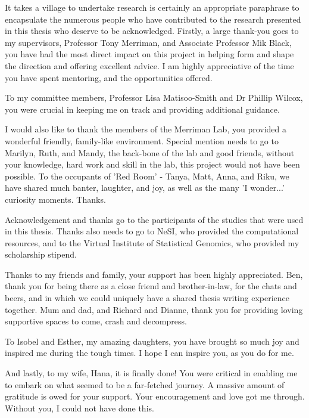 
It takes a village to undertake research is certainly an appropriate paraphrase to encapsulate the numerous people who have contributed to the research presented in this thesis who deserve to be acknowledged. Firstly, a large thank-you goes to my supervisors, Professor Tony Merriman, and Associate Professor Mik Black, you have had the most direct impact on this project in helping form and shape the direction and offering excellent advice. I am highly appreciative of the time you have spent mentoring, and the opportunities offered.

To my committee members, Professor Lisa Matisoo-Smith and Dr Phillip Wilcox, you were crucial in keeping me on track and providing additional guidance.

I would also like to thank the members of the Merriman Lab, you provided a wonderful friendly, family-like environment. Special mention needs to go to Marilyn, Ruth, and Mandy, the back-bone of the lab and good friends, without your knowledge, hard work and skill in the lab, this project would not have been possible. To the occupants of 'Red Room' - Tanya, Matt, Anna, and Riku, we have shared much banter, laughter, and joy, as well as the many 'I wonder...' curiosity moments. Thanks.

Acknowledgement and thanks go to the participants of the studies that were used in this thesis. Thanks also needs to go to NeSI, who provided the computational resources, and to the Virtual Institute of Statistical Genomics, who provided my scholarship stipend.

Thanks to my friends and family, your support has been highly appreciated. Ben, thank you for being there as a close friend and brother-in-law, for the chats and beers, and in which we could uniquely have a shared thesis writing experience together. Mum and dad, and Richard and Dianne, thank you for providing loving supportive spaces to come, crash and decompress.

To Isobel and Esther, my amazing daughters, you have brought so much joy and inspired me during the tough times. I hope I can inspire you, as you do for me.

And lastly, to my wife, Hana, it is finally done! You were critical in enabling me to embark on what seemed to be a far-fetched journey. A massive amount of gratitude is owed for your support. Your encouragement and love got me through. Without you, I could not have done this.
